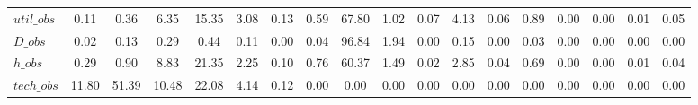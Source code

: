\begin{center}
\begin{longtable}{lccccccccccccccccc}
$util\_obs      $	 & 	            0.11	 & 	            0.36	 & 	            6.35	 & 	           15.35	 & 	            3.08	 & 	            0.13	 & 	            0.59	 & 	           67.80	 & 	            1.02	 & 	            0.07	 & 	            4.13	 & 	            0.06	 & 	            0.89	 & 	            0.00	 & 	            0.00	 & 	            0.01	 & 	            0.05 \\ 
$D\_obs         $	 & 	            0.02	 & 	            0.13	 & 	            0.29	 & 	            0.44	 & 	            0.11	 & 	            0.00	 & 	            0.04	 & 	           96.84	 & 	            1.94	 & 	            0.00	 & 	            0.15	 & 	            0.00	 & 	            0.03	 & 	            0.00	 & 	            0.00	 & 	            0.00	 & 	            0.00 \\ 
$h\_obs         $	 & 	            0.29	 & 	            0.90	 & 	            8.83	 & 	           21.35	 & 	            2.25	 & 	            0.10	 & 	            0.76	 & 	           60.37	 & 	            1.49	 & 	            0.02	 & 	            2.85	 & 	            0.04	 & 	            0.69	 & 	            0.00	 & 	            0.00	 & 	            0.01	 & 	            0.04 \\ 
$tech\_obs      $	 & 	           11.80	 & 	           51.39	 & 	           10.48	 & 	           22.08	 & 	            4.14	 & 	            0.12	 & 	            0.00	 & 	            0.00	 & 	            0.00	 & 	            0.00	 & 	            0.00	 & 	            0.00	 & 	            0.00	 & 	            0.00	 & 	            0.00	 & 	            0.00	 & 	            0.00 \\ 
\end{longtable}
 \end{center}
